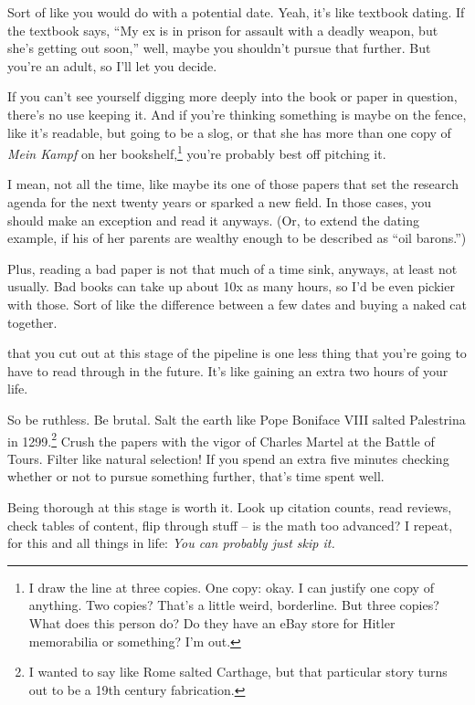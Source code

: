 Sort of like you would do with a potential date. Yeah, it's like textbook
dating. If the textbook says, ``My ex is in prison for assault with a deadly weapon, but she's getting out
soon,'' well, maybe you shouldn't pursue that further. But you're an adult, so
I'll let you decide.

If you can't see yourself digging more deeply into the book or paper in
question, there's no use keeping it. And if you're thinking something is maybe on
the fence, like it's readable, but going to be a slog, or that she has more than
one copy of \textit{Mein Kampf} on her bookshelf,\footnote{I draw the
  line at three copies. One copy: okay. I can justify one copy of anything. Two
  copies? That's a little weird, borderline. But three copies? What does
  this person do? Do they have an eBay store for Hitler memorabilia or
  something? I'm out.} you're probably best off
pitching it.

I mean, not all the time, like maybe its one of those papers that set the research
agenda for the next twenty years or sparked a new field. In those cases, you
should make an exception and read it anyways. (Or, to extend the dating example,
if his of her parents are wealthy enough to be described as ``oil barons.'')

Plus, reading a bad paper is not that much of a time sink, anyways, at least not
usually. Bad books can take up about 10x as many hours, so I'd be even pickier
with those. Sort of like the difference between a few dates and buying a naked
cat together. 

 that you cut out at this stage of the
pipeline is one less thing that you're going to have to read through in the
future. It's like gaining an extra two hours of your life.

So be ruthless. Be brutal. Salt the earth like Pope Boniface VIII salted Palestrina in 1299.\footnote{I wanted to say like Rome salted Carthage, but that particular story turns out to be a 19th century fabrication.} Crush the papers with the vigor of Charles Martel at the Battle of Tours. Filter like natural selection! If
you spend an extra five minutes checking whether or not to pursue something
further, that's time spent well.

Being thorough at this stage is worth it. Look up citation counts, read
reviews, check tables of content, flip through stuff -- is the math too advanced?
I repeat, for this and all things in life: \textit{You can probably just skip
  it.}

